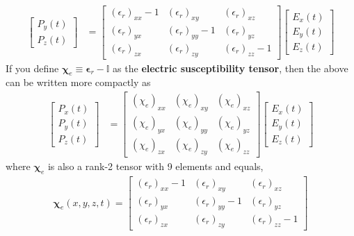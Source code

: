 \begin{itemize}
\begin{align*}
\begin{bmatrix}
        P_y(t) \\
        P_z(t)
      \end{bmatrix}
      &=
      \begin{bmatrix}
        (\epsilon_r)_{xx} - 1 & (\epsilon_r)_{xy} & (\epsilon_r)_{xz} \\
        (\epsilon_r)_{yx} & (\epsilon_r)_{yy} - 1 & (\epsilon_r)_{yz} \\
        (\epsilon_r)_{zx} & (\epsilon_r)_{zy} & (\epsilon_r)_{zz} - 1
      \end{bmatrix}
      \begin{bmatrix}
        E_x(t) \\
        E_y(t) \\
        E_z(t)
      \end{bmatrix}
    \end{align*}
    If you define \( \boldsymbol{\chi}_e \equiv \boldsymbol{\epsilon}_r - \mathbb{I} \) as the
  \textbf{electric susceptibility tensor}, then the above can be written more compactly as
    \begin{align*}
      \begin{bmatrix}
        P_x(t) \\
        P_y(t) \\
        P_z(t)
      \end{bmatrix}
      &=
      \begin{bmatrix}
        (\chi_e)_{xx} & (\chi_e)_{xy} & (\chi_e)_{xz} \\
        (\chi_e)_{yx} & (\chi_e)_{yy} & (\chi_e)_{yz} \\
        (\chi_e)_{zx} & (\chi_e)_{zy} & (\chi_e)_{zz}
      \end{bmatrix}
      \begin{bmatrix}
        E_x(t) \\
        E_y(t) \\
        E_z(t)
      \end{bmatrix}
    \end{align*}
    where \( \boldsymbol{\chi}_e \) is also a rank-2 tensor with 9 elements and
    equals,
    \begin{align*}
      \boldsymbol{\chi}_e(x,y,z,t) = \begin{bmatrix}
        (\epsilon_r)_{xx} - 1 & (\epsilon_r)_{xy} & (\epsilon_r)_{xz} \\
        (\epsilon_r)_{yx} & (\epsilon_r)_{yy} - 1 & (\epsilon_r)_{yz} \\
        (\epsilon_r)_{zx} & (\epsilon_r)_{zy} & (\epsilon_r)_{zz} - 1
      \end{bmatrix}

\end{align*}
\end{itemize}
